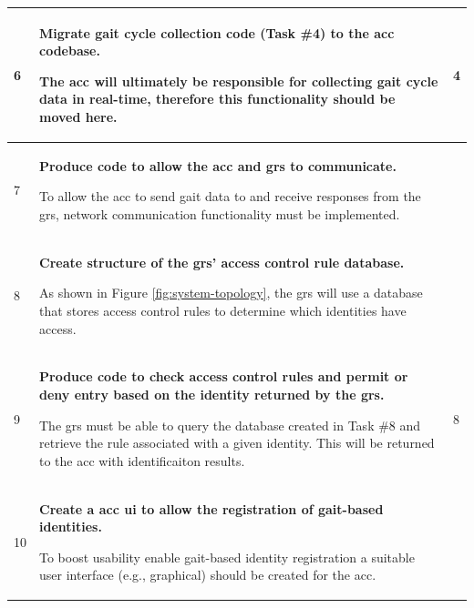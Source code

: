 \begin{scriptsize}
\begin{longtable}[c]{|p{}|p{}|p{}|}
        6           & \textbf{Migrate gait cycle collection code (Task \#4) to the \ac{acc} codebase.}                                                \par The \ac{acc} will ultimately be responsible for collecting gait cycle data in real-time, therefore this functionality should be moved here.                                                                                                                                         & 4                     \\ \hline
        7           & \textbf{Produce code to allow the \ac{acc} and \ac{grs} to communicate.}                                         \par To allow the \ac{acc} to send gait data to and receive responses from the \ac{grs}, network communication functionality must be implemented.                                                                                                                                                       &                       \\ \hline
        8           & \textbf{Create structure of the \ac{grs}' access control rule database.}                                                             \par As shown in Figure \ref{fig:system-topology}, the \ac{grs} will use a database that stores access control rules to determine which identities have access.                                                                                                                     &                       \\ \hline
        9           & \textbf{Produce code to check access control rules and permit or deny entry based on the identity returned by the \ac{grs}.}                             \par The \ac{grs} must be able to query the database created in Task \#8 and retrieve the rule associated with a given identity. This will be returned to the \ac{acc} with identificaiton results.                                                             & 8                     \\ \hline
        10          & \textbf{Create a \ac{acc} \ac{ui} to allow the registration of gait-based identities.}                         \par To boost usability enable gait-based identity registration a suitable user interface (e.g., graphical) should be created for the \ac{acc}.                                                                                                                                                           &                       \\ \hline

\end{longtable}
\end{scriptsize}
